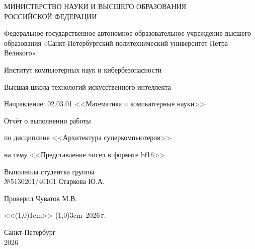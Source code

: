\thispagestyle{empty} %

\begin{center}
    МИНИСТЕРСТВО НАУКИ И ВЫСШЕГО ОБРАЗОВАНИЯ\\ РОССИЙСКОЙ ФЕДЕРАЦИИ

    Федеральное государственное автономное образовательное учреждение высшего образования «Санкт-Петербургский политехнический университет Петра Великого»

    Институт компьютерных наук и кибербезопасности

    Высшая школа технологий искусственного интеллекта

    Направление: 02.03.01 <<Математика и компьютерные науки>>

    \vspace{5cm}
    {\Large
        Отчёт о выполнении работы

        по дисциплине <<Архитектура суперкомпьютеров>>

        на тему <<Представление чисел в формате bf16>>


    }
    \vspace{4cm}

    \begin{minipage}{\textwidth}
        Выполнила студентка группы \\
        №5130201/40101 \hfill Старкова Ю.А.

        \vspace{0.5cm}

        Проверил
        \hfill Чуватов М.В.
    \end{minipage}

    \vspace{1cm}
    \hfill
    <<\line(1,0){1cm}>> \line(1,0){3cm}\, 2026\,г.

    \vspace{2cm}
    Санкт-Петербург \\
    2026
\end{center}